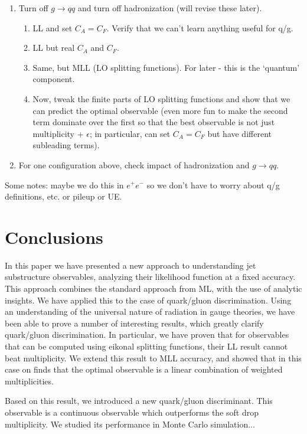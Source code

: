 \documentclass[letterpaper,11pt]{article}
\begin{document}
\begin{enumerate}
\item Turn off $g\rightarrow qq$ and turn off hadronization (will revise these later).  
\begin{enumerate}
	\item LL and set $C_A=C_F$.  Verify that we can't learn anything useful for q/g.
	\item LL but real $C_A$ and $C_F$.
	\item Same, but MLL (LO splitting functions).  For later - this is the `quantum' component.
	\item Now, tweak the finite parts of LO splitting functions and show that we can predict the optimal observable (even more fun to make the second term dominate over the first so that the best observable is not just multiplicity + $\epsilon$; in particular, can set $C_A=C_F$ but have different subleading terms).
\end{enumerate}
\item For one configuration above, check impact of hadronization and $g\rightarrow qq$.
\end{enumerate}

Some notes: maybe we do this in $e^+e^-$ so we don't have to worry about q/g definitions, etc. or pileup or UE.

\section{Conclusions}
\label{sec:conc}

In this paper we have presented a new approach to understanding jet substructure observables, analyzing their likelihood function at a fixed accuracy. This approach combines the standard approach from ML, with the use of analytic insights. We have applied this to the case of quark/gluon discrimination. Using an understanding of the universal nature of radiation in gauge theories, we have been able to prove a number of interesting results, which greatly clarify quark/gluon discrimination. In particular, we have proven that for observables that can be computed using eikonal splitting functions, their LL result cannot beat multiplicity. We extend this result to MLL accuracy, and showed that in this case on finds that the optimal observable is a linear combination of weighted multiplicities.

Based on this result, we introduced a new quark/gluon discriminant. This observable is a continuous observable which outperforms the soft drop multiplicity. We studied its performance in Monte Carlo simulation...
\end{document}
